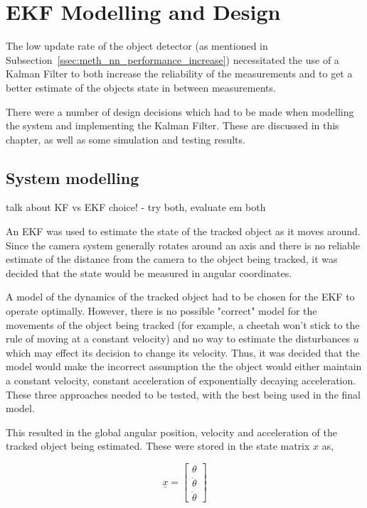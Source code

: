 \chapter{EKF Modelling and Design}

The low update rate of the object detector (as mentioned in Subsection~\ref{ssec:meth_nn_performance_increase}) necessitated the use of a Kalman Filter to both increase the reliability of the measurements and to get a better estimate of the objects state in between measurements.

There were a number of design decisions which had to be made when modelling the system and implementing the Kalman Filter. These are discussed in this chapter, as well as some simulation and testing results.


\section{System modelling}
{\color{red} talk about KF vs EKF choice! - try both, evaluate em both}

An EKF was used to estimate the state of the tracked object as it moves around. Since the camera system generally rotates around an axis and there is no reliable estimate of the distance from the camera to the object being tracked, it was decided that the state would be measured in angular coordinates.

A model of the dynamics of the tracked object had to be chosen for the EKF to operate optimally. However, there is no possible "correct" model for the movements of the object being tracked (for example, a cheetah won't stick to the rule of moving at a constant velocity) and no way to estimate the disturbances $u$ which may effect its decision to change its velocity. Thus, it was decided that the model would make the incorrect assumption the the object would either maintain a constant velocity, constant acceleration of exponentially decaying acceleration. These three approaches needed to be tested, with the best being used in the final model.

This resulted in the global angular position, velocity and acceleration of the tracked object being estimated. These were stored in the state matrix $x$ as,

\[ \underline{x} = \begin{bmatrix} \theta \\ \dot{\theta} \\ \ddot{\theta} \end{bmatrix} \]

